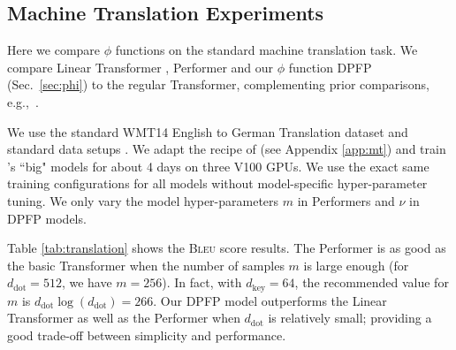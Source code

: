 \documentclass{article}
\theoremstyle{definition}
\begin{document}
\subsection{Machine Translation Experiments}
\label{sec:translation}
Here we compare $\phi$ functions on the standard machine translation task.
We compare Linear Transformer \citep{katharopoulos2020transformers},
Performer \citep{choromanski2020rethinking} and our $\phi$ function DPFP (Sec.~\ref{sec:phi})
to the regular Transformer,  complementing prior comparisons, e.g.,~\citet{tay2020long}.

We use the standard WMT14 English to German Translation dataset and
standard data setups \cite{ott2018, trafo}.
We adapt the recipe of \citet{OttEBFGNGA19} (see Appendix \ref{app:mt})
and train \citet{trafo}'s ``big" models for about 4 days on three V100 GPUs.
We use the exact same training configurations for all
models without model-specific hyper-parameter tuning.
We only vary the model hyper-parameters $m$ in Performers and $\nu$ in DPFP models.

Table \ref{tab:translation} shows the \textsc{Bleu} score \citep{papineni2002bleu, post2018} results.
The Performer is as good as the basic Transformer when the number of samples $m$ is large enough (for $d_\text{dot}=512$, we have $m=256$).
In fact, with $d_\text{key}=64$, the recommended value for $m$ is $d_\text{dot}\log(d_\text{dot})=266$.
Our DPFP model outperforms the Linear Transformer
as well as the Performer when $d_\text{dot}$ is relatively small;
providing a good trade-off between simplicity and performance.
\end{document}
